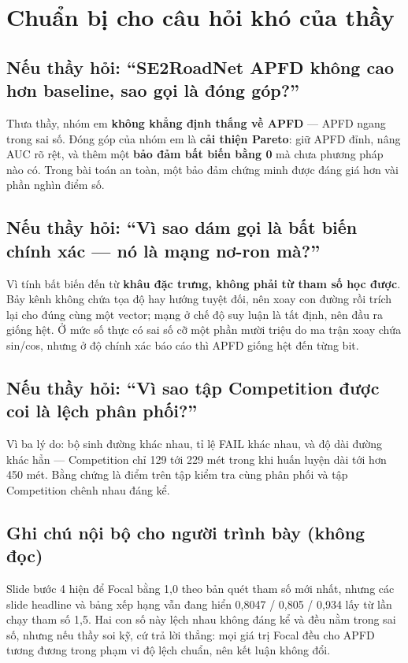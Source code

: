 \documentclass[
  11pt,
]{article}
\begin{document}
\section{Chuẩn bị cho câu hỏi khó của
thầy}\label{chuux1ea9n-bux1ecb-cho-cuxe2u-hux1ecfi-khuxf3-cux1ee7a-thux1ea7y}

\subsection{Nếu thầy hỏi: ``SE2RoadNet APFD không cao hơn baseline, sao
gọi là đóng
góp?''}\label{nux1ebfu-thux1ea7y-hux1ecfi-se2roadnet-apfd-khuxf4ng-cao-hux1a1n-baseline-sao-gux1ecdi-luxe0-ux111uxf3ng-guxf3p}

Thưa thầy, nhóm em \textbf{không khẳng định thắng về APFD} --- APFD
ngang trong sai số. Đóng góp của nhóm em là \textbf{cải thiện Pareto}:
giữ APFD đỉnh, nâng AUC rõ rệt, và thêm một \textbf{bảo đảm bất biến
bằng 0} mà chưa phương pháp nào có. Trong bài toán an toàn, một bảo đảm
chứng minh được đáng giá hơn vài phần nghìn điểm số.

\subsection{Nếu thầy hỏi: ``Vì sao dám gọi là bất biến chính xác --- nó
là mạng nơ-ron
mà?''}\label{nux1ebfu-thux1ea7y-hux1ecfi-vuxec-sao-duxe1m-gux1ecdi-luxe0-bux1ea5t-biux1ebfn-chuxednh-xuxe1c-nuxf3-luxe0-mux1ea1ng-nux1a1-ron-muxe0}

Vì tính bất biến đến từ \textbf{khâu đặc trưng, không phải từ tham số
học được}. Bảy kênh không chứa tọa độ hay hướng tuyệt đối, nên xoay con
đường rồi trích lại cho đúng cùng một vector; mạng ở chế độ suy luận là
tất định, nên đầu ra giống hệt. Ở mức số thực có sai số cỡ một phần mười
triệu do ma trận xoay chứa sin/cos, nhưng ở độ chính xác báo cáo thì
APFD giống hệt đến từng bit.

\subsection{Nếu thầy hỏi: ``Vì sao tập Competition được coi là lệch phân
phối?''}\label{nux1ebfu-thux1ea7y-hux1ecfi-vuxec-sao-tux1eadp-competition-ux111ux1b0ux1ee3c-coi-luxe0-lux1ec7ch-phuxe2n-phux1ed1i}

Vì ba lý do: bộ sinh đường khác nhau, tỉ lệ FAIL khác nhau, và độ dài
đường khác hẳn --- Competition chỉ 129 tới 229 mét trong khi huấn luyện
dài tới hơn 450 mét. Bằng chứng là điểm trên tập kiểm tra cùng phân phối
và tập Competition chênh nhau đáng kể.

\subsection{Ghi chú nội bộ cho người trình bày (không
đọc)}\label{ghi-chuxfa-nux1ed9i-bux1ed9-cho-ngux1b0ux1eddi-truxecnh-buxe0y-khuxf4ng-ux111ux1ecdc}

Slide bước 4 hiện để Focal bằng 1,0 theo bản quét tham số mới nhất,
nhưng các slide headline và bảng xếp hạng vẫn đang hiển 0,8047 / 0,805 /
0,934 lấy từ lần chạy tham số 1,5. Hai con số này lệch nhau không đáng
kể và đều nằm trong sai số, nhưng nếu thầy soi kỹ, cứ trả lời thẳng: mọi
giá trị Focal đều cho APFD tương đương trong phạm vi độ lệch chuẩn, nên
kết luận không đổi.
\end{document}
